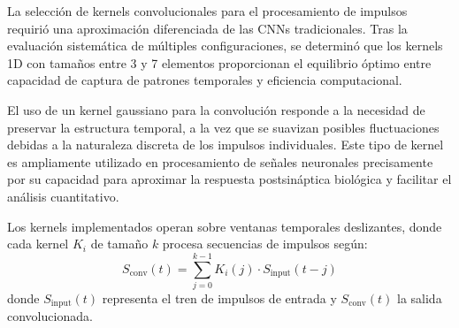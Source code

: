 La selección de kernels convolucionales para el procesamiento de impulsos requirió una aproximación diferenciada de las CNNs tradicionales. Tras la evaluación sistemática de múltiples configuraciones, se determinó que los kernels 1D con tamaños entre 3 y 7 elementos proporcionan el equilibrio óptimo entre capacidad de captura de patrones temporales y eficiencia computacional.

El uso de un kernel gaussiano para la convolución responde a la necesidad de preservar la estructura temporal, a la vez que se suavizan posibles fluctuaciones debidas a la naturaleza discreta de los impulsos individuales. Este tipo de kernel es ampliamente utilizado en procesamiento de señales neuronales precisamente por su capacidad para aproximar la respuesta postsináptica biológica y facilitar el análisis cuantitativo.

Los kernels implementados operan sobre ventanas temporales deslizantes, donde cada kernel \( K_i \) de tamaño \( k \) procesa secuencias de impulsos según:
\begin{equation}
    S_{\text{conv}}(t) = \sum_{j=0}^{k-1} K_i(j) \cdot S_{\text{input}}(t-j)
\end{equation}
donde \( S_{\text{input}}(t) \) representa el tren de impulsos de entrada y \( S_{\text{conv}}(t) \) la salida convolucionada.






